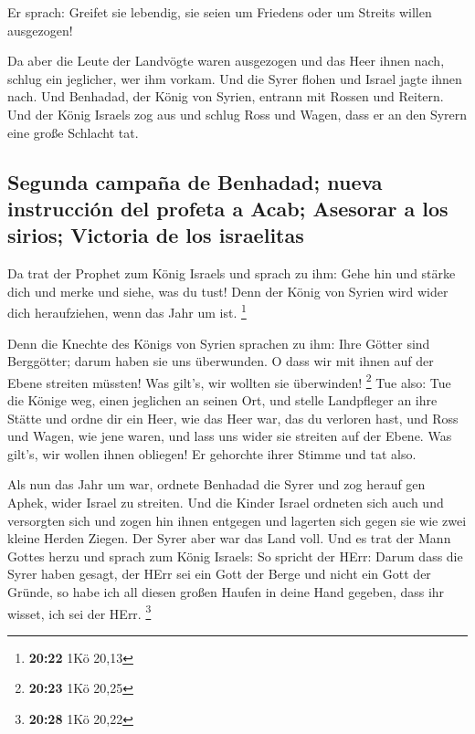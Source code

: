  Er sprach: Greifet sie lebendig, sie seien um Friedens
oder um Streits willen ausgezogen!

 Da aber die Leute der Landvögte waren ausgezogen und das
Heer ihnen nach,  schlug ein jeglicher, wer ihm vorkam.
Und die Syrer flohen und Israel jagte ihnen nach. Und Benhadad, der
König von Syrien, entrann mit Rossen und Reitern.  Und
der König Israels zog aus und schlug Ross und Wagen, dass er an den
Syrern eine große Schlacht tat.

\hypertarget{segunda-campauxf1a-de-benhadad-nueva-instrucciuxf3n-del-profeta-a-acab-asesorar-a-los-sirios-victoria-de-los-israelitas}{%
\subsection{Segunda campaña de Benhadad; nueva instrucción del profeta a
Acab; Asesorar a los sirios; Victoria de los
israelitas}\label{segunda-campauxf1a-de-benhadad-nueva-instrucciuxf3n-del-profeta-a-acab-asesorar-a-los-sirios-victoria-de-los-israelitas}}

 Da trat der Prophet zum König Israels und sprach zu ihm:
Gehe hin und stärke dich und merke und siehe, was du tust! Denn der
König von Syrien wird wider dich heraufziehen, wenn das Jahr um ist.
\footnote{\textbf{20:22} 1Kö 20,13}

 Denn die Knechte des Königs von Syrien sprachen zu ihm:
Ihre Götter sind Berggötter; darum haben sie uns überwunden. O dass wir
mit ihnen auf der Ebene streiten müssten! Was gilt's, wir wollten sie
überwinden! \footnote{\textbf{20:23} 1Kö 20,25}  Tue
also: Tue die Könige weg, einen jeglichen an seinen Ort, und stelle
Landpfleger an ihre Stätte  und ordne dir ein Heer, wie
das Heer war, das du verloren hast, und Ross und Wagen, wie jene waren,
und lass uns wider sie streiten auf der Ebene. Was gilt's, wir wollen
ihnen obliegen! Er gehorchte ihrer Stimme und tat also.

 Als nun das Jahr um war, ordnete Benhadad die Syrer und
zog herauf gen Aphek, wider Israel zu streiten.  Und die
Kinder Israel ordneten sich auch und versorgten sich und zogen hin ihnen
entgegen und lagerten sich gegen sie wie zwei kleine Herden Ziegen. Der
Syrer aber war das Land voll.  Und es trat der Mann
Gottes herzu und sprach zum König Israels: So spricht der HErr: Darum
dass die Syrer haben gesagt, der HErr sei ein Gott der Berge und nicht
ein Gott der Gründe, so habe ich all diesen großen Haufen in deine Hand
gegeben, dass ihr wisset, ich sei der HErr. \footnote{\textbf{20:28} 1Kö
  20,22}

